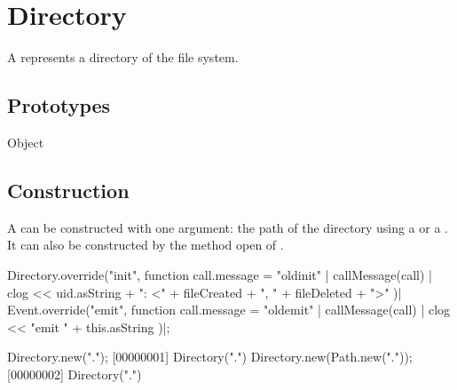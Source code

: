 
\section{Directory}

A  represents a directory of the file system.

\subsection{Prototypes}
\begin{refObjects}
\item[Object]
\end{refObjects}

\subsection{Construction}

A  can be constructed with one argument: the path of
the directory using a  or a . It can
also be constructed by the method open of .

\begin{urbiscript}[firstnumber=1]
Directory.override("init", function {
  call.message = "oldinit" | callMessage(call) |
  clog << uid.asString + ": <" + fileCreated + ", " + fileDeleted + ">"
})|
Event.override("emit", function {
  call.message = "oldemit" | callMessage(call) |
  clog << "emit " + this.asString
})|;

Directory.new(".");
[00000001] Directory(".")
Directory.new(Path.new("."));
[00000002] Directory(".")
\end{urbiscript}

